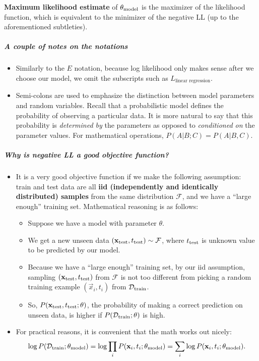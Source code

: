 \documentclass{discussion}
\providecommand{\tightlist}{%
\setlength{\itemsep}{2pt}\setlength{\parskip}{0pt}}
\begin{document}
  \textbf{Maximum likelihood estimate} of \(\mathbf{\theta}_{\text{model}}\) is the maximizer of
  the likelihood function, which is equivalent to the minimizer of the
  negative LL (up to the aforementioned subtleties).

\subparagraph{A couple of notes on the notations}
\begin{itemize}
  \item Similarly to the \(E\) notation, because log
likelihood only makes sense after we choose our model, we omit the
subscripts such as \(L_{\text{linear regression}}\).
  \item Semi-colons are
used to emphasize the distinction between model parameters and random
variables. Recall that a probabilistic model defines the probability of
observing a particular data. It is more natural to say that this
probability is \emph{determined by} the parameters as opposed to
\emph{conditioned on} the parameter values. For mathematical operations,
\(P(A | B; C) = P(A | B, C)\).
\end{itemize}

\subparagraph{Why is negative LL a good objective
function?}\label{why-is-negative-ll-a-good-objective-function}

\begin{itemize}
\tightlist
\item
  It is a very good objective function if we make the following
  assumption: train and test data are all \textbf{iid (independently and
  identically distributed) samples} from the same distribution
  \(\mathcal{F}\), and we have a ``large enough'' training set.  Mathematical reasoning is as follows:

  \begin{itemize}
  \tightlist
  \item
    Suppose we have a model with parameter \(\theta\).
  \item
    We get a new unseen data
    \((\mathbf{x}_{\mathrm{test}}, t_{\mathrm{test}}) \sim \mathcal{F}\), where \(t_{\mathrm{test}}\) is
    unknown value to be predicted by our model.
  \item
    Because we have a ``large enough'' training set, by our iid
    assumption, sampling \((\mathbf{x}_{\mathrm{test}}, t_{\mathrm{test}})\) from
    \(\mathcal{F}\) is not too different from picking a random training
    example \((\vec{x}_i, t_i)\) from \(\mathcal{D}_{\mathrm{train}}\).
  \item
    So, \(P(\mathbf{x}_{\mathrm{test}}, t_{\mathrm{test}}; \theta)\), the probability of making
    a correct prediction on unseen data, is higher if
    \(P(\mathcal{D}_{\mathrm{train}}; \theta)\) is high.
  \end{itemize}
\item
  For practical reasons, it is convenient that the math works out nicely:
  \[\log P(\mathcal{D}_{\mathrm{train}}; \mathbf{\theta}_{\text{model}}) = \log \prod_{i} P(\mathbf{x}_i, t_i; \mathbf{\theta}_{\text{model}}) = \sum_{i} \log P(\mathbf{x}_i, t_i; \mathbf{\theta}_{\text{model}}).\]
\end{itemize}
\end{document}
